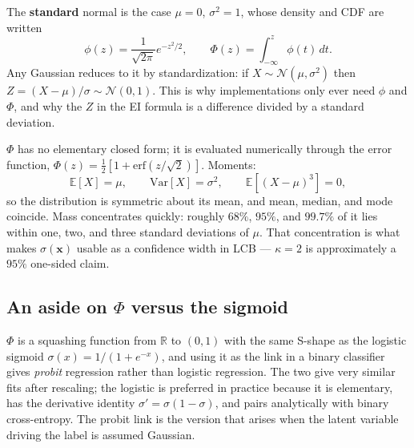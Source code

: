 \documentclass[conference]{IEEEtran}
\begin{document}
The \textbf{standard} normal is the case $\mu = 0$, $\sigma^2 = 1$, whose density and CDF are written
\begin{equation}
    \phi(z) = \frac{1}{\sqrt{2\pi}}e^{-z^2/2},
    \qquad
    \Phi(z) = \int_{-\infty}^{z}\phi(t)\,dt.
\end{equation}
Any Gaussian reduces to it by standardization: if $X \sim \mathcal{N}(\mu,\sigma^2)$ then $Z = (X-\mu)/\sigma \sim \mathcal{N}(0,1)$. This is why implementations only ever need $\phi$ and $\Phi$, and why the $Z$ in the EI formula is a difference divided by a standard deviation.

$\Phi$ has no elementary closed form; it is evaluated numerically through the error function, $\Phi(z) = \tfrac{1}{2}\left[1 + \mathrm{erf}(z/\sqrt{2})\right]$. Moments:
\begin{equation}
    \mathbb{E}[X] = \mu, \qquad \mathrm{Var}[X] = \sigma^2, \qquad \mathbb{E}\!\left[(X-\mu)^3\right] = 0,
\end{equation}
so the distribution is symmetric about its mean, and mean, median, and mode coincide. Mass concentrates quickly: roughly $68\%$, $95\%$, and $99.7\%$ of it lies within one, two, and three standard deviations of $\mu$. That concentration is what makes $\sigma(\mathbf{x})$ usable as a confidence width in LCB --- $\kappa = 2$ is approximately a $95\%$ one-sided claim.

\subsection*{An aside on $\Phi$ versus the sigmoid}
$\Phi$ is a squashing function from $\mathbb{R}$ to $(0,1)$ with the same S-shape as the logistic sigmoid $\sigma(x) = 1/(1+e^{-x})$, and using it as the link in a binary classifier gives \textit{probit} regression rather than logistic regression. The two give very similar fits after rescaling; the logistic is preferred in practice because it is elementary, has the derivative identity $\sigma' = \sigma(1-\sigma)$, and pairs analytically with binary cross-entropy. The probit link is the version that arises when the latent variable driving the label is assumed Gaussian.
\end{document}
